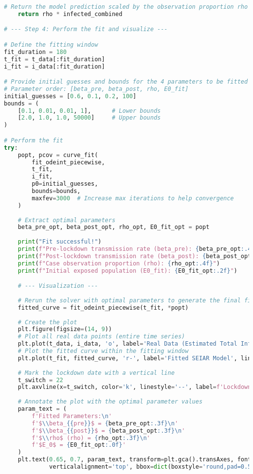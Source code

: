 \begin{lstlisting}[language=Python, caption={Python script for fitting a two-stage piecewise deterministic SEIAR model, corresponding to the pre- and post-lockdown phases.}]
    # Return the model prediction scaled by the observation proportion rho
    return rho * infected_combined

# --- Step 4: Perform the fit and visualize ---

# Define the fitting window
fit_duration = 180
t_fit = t_data[:fit_duration]
i_fit = i_data[:fit_duration]

# Provide initial guesses and bounds for the 4 parameters to be fitted
# Parameter order: [beta_pre, beta_post, rho, E0_fit]
initial_guesses = [0.6, 0.1, 0.2, 100]
bounds = (
    [0.1, 0.01, 0.01, 1],      # Lower bounds
    [2.0, 1.0, 1.0, 50000]     # Upper bounds
)

# Perform the fit
try:
    popt, pcov = curve_fit(
        fit_odeint_piecewise,
        t_fit, 
        i_fit, 
        p0=initial_guesses, 
        bounds=bounds,
        maxfev=3000  # Increase max iterations to help convergence
    )
    
    # Extract optimal parameters
    beta_pre_opt, beta_post_opt, rho_opt, E0_fit_opt = popt
    
    print("Fit successful!")
    print(f"Pre-lockdown transmission rate (beta_pre): {beta_pre_opt:.4f}")
    print(f"Post-lockdown transmission rate (beta_post): {beta_post_opt:.4f}")
    print(f"Case observation proportion (rho): {rho_opt:.4f}")
    print(f"Initial exposed population (E0_fit): {E0_fit_opt:.2f}")

    # --- Visualization ---
    
    # Rerun the solver with optimal parameters to generate the final fitted curve
    fitted_curve = fit_odeint_piecewise(t_fit, *popt)
    
    # Create the plot
    plt.figure(figsize=(14, 9))
    # Plot all real data points (entire time series)
    plt.plot(t_data, i_data, 'o', label='Real Data (Estimated Total Infectious)', markersize=4, alpha=0.5)
    # Plot the fitted curve within the fitting window
    plt.plot(t_fit, fitted_curve, 'r-', label='Fitted SEIAR Model', linewidth=3)
    
    # Mark the lockdown date with a vertical line
    t_switch = 22
    plt.axvline(x=t_switch, color='k', linestyle='--', label=f'Lockdown Start (Day {t_switch})')
    
    # Annotate the plot with the optimal parameter values
    param_text = (
        f'Fitted Parameters:\n'
        f'$\\beta_{{pre}}$ = {beta_pre_opt:.3f}\n'
        f'$\\beta_{{post}}$ = {beta_post_opt:.3f}\n'
        f'$\\rho$ (rho) = {rho_opt:.3f}\n'
        f'$E_0$ = {E0_fit_opt:.0f}'
    )
    plt.text(0.65, 0.7, param_text, transform=plt.gca().transAxes, fontsize=12,
             verticalalignment='top', bbox=dict(boxstyle='round,pad=0.5', fc='wheat', alpha=0.5))
    

\end{lstlisting}
